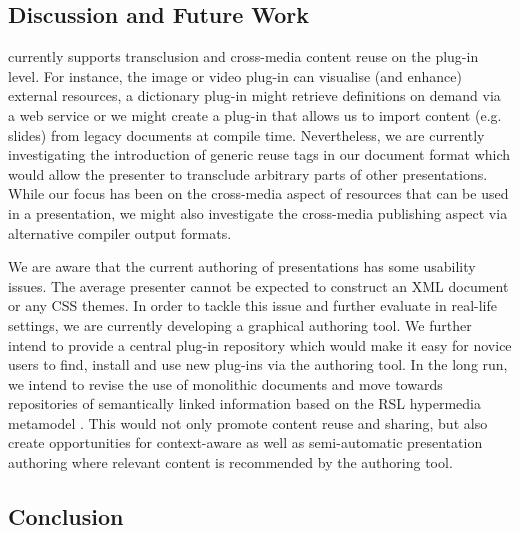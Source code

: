    \subsection{Discussion and Future Work}

    \mxp currently supports transclusion and cross-media content reuse on the
    plug-in level. For instance, the image or video plug-in can visualise (and
    enhance) external resources, a dictionary plug-in might retrieve
    definitions on demand via a web service or we might create a plug-in that
    allows us to import content (e.g. \ppt slides) from legacy documents at
    compile time. Nevertheless, we are currently investigating the introduction
    of generic reuse tags in our document format which would allow the
    presenter to transclude arbitrary parts of other \mxp presentations. While
    our focus has been on the cross-media aspect of resources that can be used
    in a presentation, we might also investigate the cross-media publishing
    aspect via alternative compiler output formats.

    We are aware that the current authoring of \mxp presentations has some
    usability issues. The average presenter cannot be expected to construct an
    XML document or any CSS themes. In order to tackle this issue and further
    evaluate \mxp in real-life settings, we are currently developing a
    graphical \mxp authoring tool. We further intend to provide a central
    plug-in repository which would make it easy for novice users to find,
    install and use new plug-ins via the authoring tool. In the long run, we
    intend to revise the use of monolithic documents and move towards
    repositories of semantically linked information based on the RSL hypermedia
    metamodel \citep{signer-3}. This would not only promote content reuse and
    sharing, but also create opportunities for context-aware as well as
    semi-automatic presentation authoring where relevant content is recommended
    by the authoring tool.

   \subsection{Conclusion}

   
